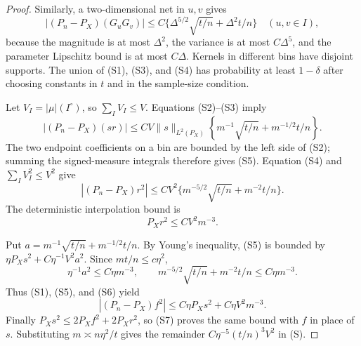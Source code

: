 \begin{proof}
Similarly, a two-dimensional net in $u,v$ gives
\[
 |(P_n-P_X)(G_uG_v)|
 \le C\{\Delta^{5/2}\sqrt{t/n}+\Delta^2t/n\}
 \quad(u,v\in I), \tag{S4}
\]
because the magnitude is at most $\Delta^2$, the variance is at
most $C\Delta^5$, and the parameter Lipschitz bound is at most
$C\Delta$. Kernels in different bins have disjoint supports.
The union of (S1), (S3), and (S4) has probability at least $1-\delta$
after choosing constants in $t$ and in the sample-size condition.

Let $V_I=|\mu|(I^\circ)$, so $\sum_I V_I\le V$.
Equations (S2)--(S3) imply
\[
 |(P_n-P_X)(sr)|
 \le C V\|s\|_{L^2(P_X)}
       \left\{m^{-1}\sqrt{t/n}+m^{-1/2}t/n\right\}. \tag{S5}
\]
The two endpoint coefficients on a bin are bounded by the left
side of (S2); summing the signed-measure integrals therefore gives
(S5). Equation (S4) and $\sum_I V_I^2\le V^2$ give
\[
 |(P_n-P_X)r^2|
 \le C V^2\{m^{-5/2}\sqrt{t/n}+m^{-2}t/n\}. \tag{S6}
\]
The deterministic interpolation bound is
\[
 P_Xr^2\le C V^2m^{-3}. \tag{S7}
\]

Put $a=m^{-1}\sqrt{t/n}+m^{-1/2}t/n$.
By Young's inequality, (S5) is bounded by
$\eta P_Xs^2+C\eta^{-1}V^2 a^2$.
Since $mt/n\le c\eta^2$,
\[
 \eta^{-1}a^2\le C\eta m^{-3},\qquad
 m^{-5/2}\sqrt{t/n}+m^{-2}t/n\le C\eta m^{-3}.
\]
Thus (S1), (S5), and (S6) yield
\[
 |(P_n-P_X)f^2|
 \le C\eta P_Xs^2+C\eta V^2m^{-3}.
\]
Finally $P_Xs^2\le2P_Xf^2+2P_Xr^2$, so (S7) proves the same bound
with $f$ in place of $s$. Substituting $m\asymp n\eta^2/t$ gives
the remainder $C\eta^{-5}(t/n)^3V^2$ in (S).
\end{proof}
